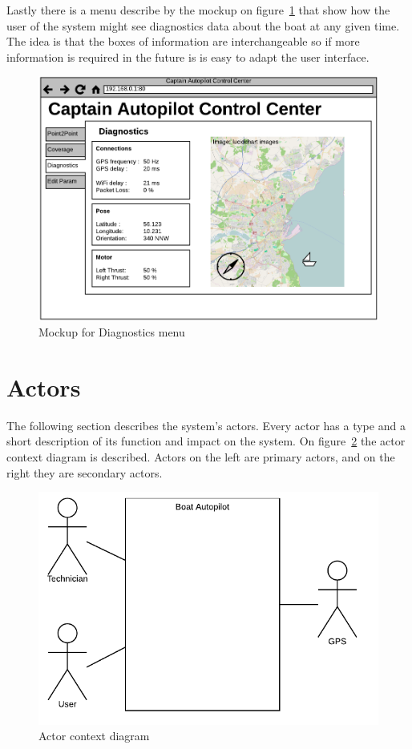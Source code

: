 Lastly there is a menu describe by the mockup on figure~\ref{fig:mockup:diagnostics} that show how the user of the system might see diagnostics data about the boat at any given time. The idea is that the boxes of information are interchangeable so if more information is required in the future is is easy to adapt the user interface.

\begin{figure}[H]
	\centering
	\includegraphics[width=1\linewidth]{Images/Requirements_specification/UI_Mockup_Diagnostics.pdf}
	\caption{Mockup for Diagnostics menu}
	\label{fig:mockup:diagnostics}
\end{figure}


\section{Actors}
The following section describes the system's actors. Every actor has a type and a short description of its function and impact on the system. On figure~\ref{fig:actor} the actor context diagram is described. Actors on the left are primary actors, and on the right they are secondary actors.

\begin{figure}[H]
	\centering
	\includegraphics{Images/Requirements_specification/Actor_context_diagram}
	\caption{Actor context diagram}
	\label{fig:actor}
\end{figure}

